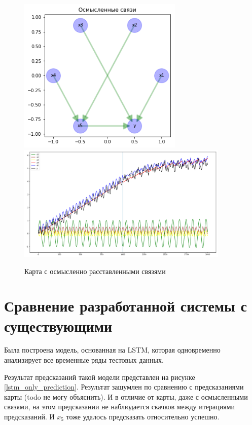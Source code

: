\begin{figure}
	\centering
	\includegraphics[width=0.7\textwidth]{./img/lstmfcm_meaningful.png}
	\includegraphics[width=0.9\textwidth]{./img/lstmfcm_meaningful_prediction.png}
	\caption{Карта с осмысленно расставленными связями}
	\label{pic:lstmfcm_meaningful}
\end{figure}


\section{Сравнение разработанной системы с существующими}

Была построена модель, основанная на LSTM,
которая одновременно анализирует все временные ряды тестовых данных.

Результат предсказаний такой модели представлен на рисунке \ref{lstm_only_prediction}.
Результат зашумлен по сравнению с предсказаниями карты (todo не могу объяснить).
И в отличие от карты, даже с осмысленными связями, на этом предсказании не наблюдается скачков
между итерациями предсказаний. И $ x_5 $ тоже удалось предсказать относительно успешно.

